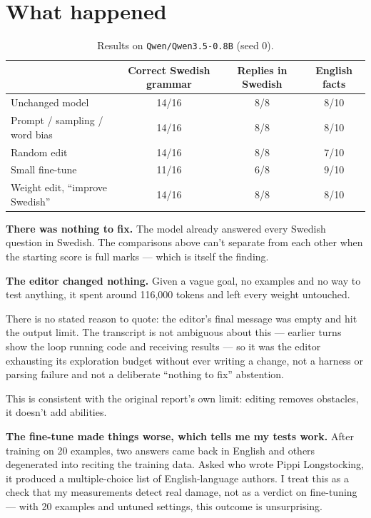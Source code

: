 \documentclass[11pt]{article}
\begin{document}
\section{What happened}

\begin{table}[h]
\centering
\caption{Results on \texttt{Qwen/Qwen3.5-0.8B} (seed 0).}
\label{tab:results}
\begin{tabular}{lccc}
\toprule
 & Correct Swedish grammar & Replies in Swedish & English facts \\
\midrule
Unchanged model & 14/16 & 8/8 & 8/10 \\
Prompt / sampling / word bias & 14/16 & 8/8 & 8/10 \\
Random edit & 14/16 & 8/8 & 7/10 \\
Small fine-tune & 11/16 & 6/8 & 9/10 \\
Weight edit, ``improve Swedish'' & 14/16 & 8/8 & 8/10 \\
\bottomrule
\end{tabular}
\end{table}

\textbf{There was nothing to fix.} The model already answered every Swedish question in
Swedish. The comparisons above can't separate from each other when the starting score is
full marks --- which is itself the finding.

\textbf{The editor changed nothing.} Given a vague goal, no examples and no way to test
anything, it spent around 116{,}000 tokens and left every weight untouched.

There is no stated reason to quote: the editor's final message was empty and hit the output
limit. The transcript is not ambiguous about this --- earlier turns show the loop running
code and receiving results --- so it was the editor exhausting its exploration budget
without ever writing a change, not a harness or parsing failure and not a deliberate
``nothing to fix'' abstention.

This is consistent with the original report's own limit: editing removes obstacles, it
doesn't add abilities.

\textbf{The fine-tune made things worse, which tells me my tests work.} After training on 20
examples, two answers came back in English and others degenerated into reciting the training
data. Asked who wrote Pippi Longstocking, it produced a multiple-choice list of
English-language authors. I treat this as a check that my measurements detect real damage,
not as a verdict on fine-tuning --- with 20 examples and untuned settings, this outcome is
unsurprising.
\end{document}
